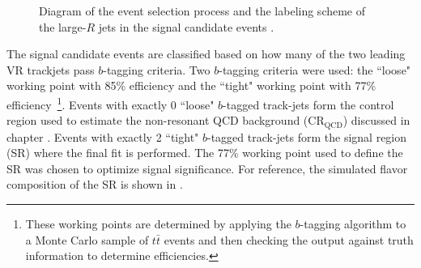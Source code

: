 \begin{figure}[!htbp]
  \centering
{}

  \caption{Diagram of the event selection process and the labeling scheme of the large-$R$ jets in the signal candidate events \cite{Feickert:2690521}.}
  \label{fig:event_selection}
\end{figure}

The signal candidate events are classified based on how
many of the two leading VR trackjets pass $b$-tagging criteria.  Two
$b$-tagging criteria were used: the ``loose" working point with 85\%
efficiency and the ``tight" working point with 77\%
efficiency~\footnote{These working points are determined by applying the
$b$-tagging algorithm to a Monte Carlo sample of $t\bar{t}$ events and then
checking the output against truth information to determine efficiencies.}.
Events with exactly 0 ``loose" $b$-tagged track-jets form the control region
used to estimate the non-resonant QCD background ($\text{CR}_{\text{QCD}}$)
discussed in chapter .  Events with exactly 2 ``tight"
$b$-tagged track-jets form the signal region (SR) where the final fit is
performed.  The 77\% working point used to define the SR was chosen to optimize
signal significance.  For reference, the simulated flavor composition of the SR
is shown in .


